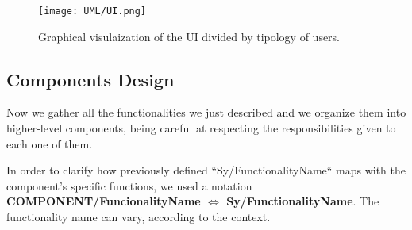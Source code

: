 \documentclass[11pt]{article} %
\begin{document}
\begin{figure}[H]
	\centering
	\texttt{[image: UML/UI.png]}
	\caption{Graphical visulaization of the UI divided by tipology of users.}
\end{figure}	


\subsection{Components Design}

Now we gather all the functionalities we just described and we organize them into higher-level components, being careful at respecting the responsibilities given to each one of them.

In order to clarify how previously defined ``Sy/FunctionalityName`` maps with the component's specific functions, we used a notation \textbf{COMPONENT/FuncionalityName $\Leftrightarrow$ Sy/FunctionalityName}. The functionality name can vary, according to the context.
\end{document}
